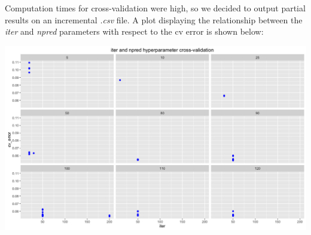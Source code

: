 Computation times for cross-validation were high, so we decided to output partial results on an incremental \textit{.csv} file. A plot displaying the relationship between the \textit{iter} and \textit{npred} parameters with respect to the cv error is shown below: 

\begin{center}
  \includegraphics[scale=0.45]{./cv.png}
\end{center}    
